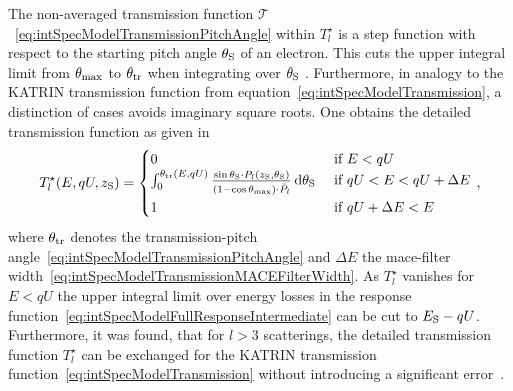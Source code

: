 The non-averaged transmission function $\mathcal{T}$~\eqref{eq:intSpecModelTransmissionPitchAngle} within $T_l^{\star}$ is a step function with respect to the starting pitch angle $\theta_\mathrm{S}$ of an electron. This cuts the upper integral limit from $\theta_\mathrm{max}$ to $\theta_\mathrm{tr}$ when integrating over $\theta_\mathrm{S}$ . Furthermore, in analogy to the KATRIN transmission function from equation~\eqref{eq:intSpecModelTransmission}, a distinction of cases avoids imaginary square roots. One obtains the detailed transmission function as given in~\cite{Groh2015,Kleesiek2019}
\begin{equation}
	\label{eq:intSpecModelDetailedTransmission}
	T_l^{\star}(E,qU,z_\mathrm{S}) =
	\begin{cases}
		0 &\text{ if } E < qU \\
		\int_{0}^{\theta_\mathrm{tr}(E,qU)}
		\frac{
			\sin\theta_\mathrm{S} \cdot
			P_l(z_\mathrm{S}, \theta_\mathrm{S})
		}{
			(1-\cos\theta_\mathrm{max}) \cdot \bar{P}_l \vphantom{\sum_i^i}
		} 
		\mathop{}\!\mathrm{d} \theta_\mathrm{S}
		&\text{ if } qU < E < qU + \Delta E \\
		1 &\text{ if } qU+\Delta E < E
	\end{cases}
	\text{\,,}
\end{equation}
where $\theta_\mathrm{tr}$ denotes the transmission-pitch angle~\eqref{eq:intSpecModelTransmissionPitchAngle} and $\Delta E$ the \gls{mace}-filter width~\eqref{eq:intSpecModelTransmissionMACEFilterWidth}. As $T_l^{\star}$ vanishes for $E<qU$ the upper integral limit over energy losses in the response function~\eqref{eq:intSpecModelFullResponseIntermediate} can be cut to $E_\mathrm{S}-qU$. Furthermore, it was found, that for $l>3$ scatterings, the detailed transmission function $T_l^{\star}$ can be exchanged for the KATRIN transmission function~\eqref{eq:intSpecModelTransmission} without introducing a significant error~\cite{Groh2015}.

